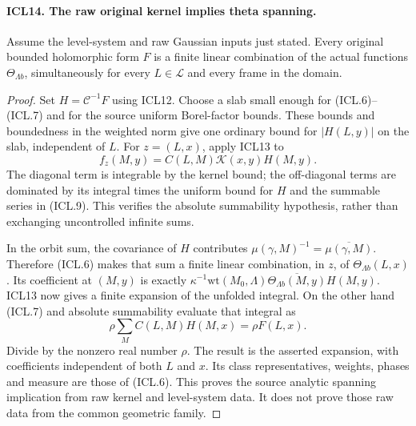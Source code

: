 \paragraph{ICL14. The raw original kernel implies theta spanning.}
\label{claim:ICL14}
Assume the level-system and raw Gaussian inputs just
stated.  Every original bounded holomorphic form \(F\)
is a finite linear combination of the actual functions
\(\Theta_{\Lambda b}\), simultaneously for every
\(L\in\mathcal L\) and every frame in the domain.
\begin{proof}
Set \(H=\mathcal C^{-1}F\) using ICL12.  Choose a slab
small enough for (ICL.6)--(ICL.7) and for the source
uniform Borel-factor bounds.  These bounds and boundedness
in the weighted norm give one ordinary bound for
\(|H(L,y)|\) on the slab, independent of \(L\).
For \(z=(L,x)\), apply ICL13 to
\[
 f_z(M,y)=C(L,M)\mathcal K(x,y)H(M,y).
\]
The diagonal term is integrable by the kernel bound;
the off-diagonal terms are dominated by its integral
times the uniform bound for \(H\) and the summable
series in (ICL.9).  This verifies the absolute
summability hypothesis, rather than exchanging
uncontrolled infinite sums.

In the orbit sum, the covariance of \(H\) contributes
\(\mu(\gamma,M)^{-1}=\overline{\mu(\gamma,M)}\).
Therefore (ICL.6) makes that sum a finite linear
combination, in \(z\), of
\(\Theta_{\Lambda b}(L,x)\).  Its coefficient at
\((M,y)\) is exactly
\(\kappa^{-1}\mathrm{wt}(M_0,\Lambda)
\overline{\Theta_{\Lambda b}(M,y)}H(M,y)\).
ICL13 now gives a finite expansion of the unfolded
integral.  On the other hand (ICL.7) and absolute
summability evaluate that integral as
\[
 \rho\sum_M C(L,M)H(M,x)=\rho F(L,x).
\]
Divide by the nonzero real number \(\rho\).  The result
is the asserted expansion, with coefficients independent
of both \(L\) and \(x\).  Its class representatives,
weights, phases and measure are those of (ICL.6).
This proves the source analytic spanning implication
from raw kernel and level-system data.  It does not
prove those raw data from the common geometric family.
\end{proof}

